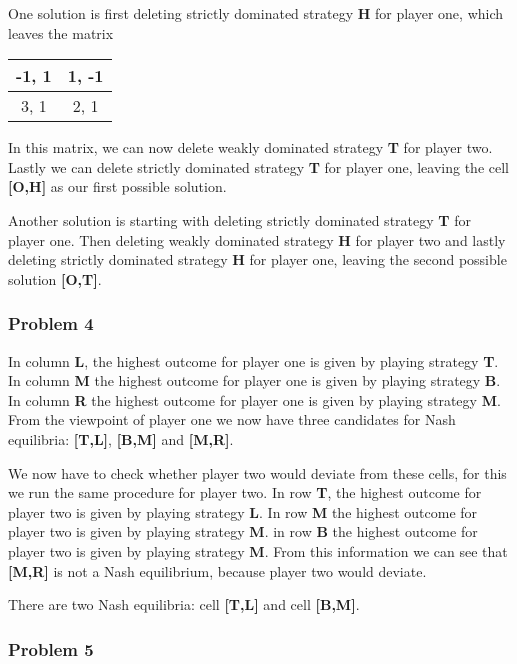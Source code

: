 \documentclass[]{article}
\begin{document}
One solution is first deleting strictly dominated strategy \textbf{H} for
player one, which leaves the matrix

\begin{tabular}{| c | c |}
  \hline			
  -1, 1 &  1, -1 \\
\hline
  3, 1 & 2, 1 \\
  \hline  
\end{tabular}

In this matrix, we can now delete weakly dominated strategy \textbf{T} for
player two. Lastly we can delete strictly dominated strategy \textbf{T}
for player one, leaving the cell \textbf{[O,H]} as our first possible
solution.

Another solution is starting with deleting strictly dominated strategy
\textbf{T} for player one. Then deleting weakly dominated strategy
\textbf{H} for player two and lastly deleting strictly dominated strategy
\textbf{H} for player one, leaving the second possible solution \textbf{[O,T]}.

\subsubsection{Problem 4}\label{problem-4}

In column \textbf{L}, the highest outcome for player one is given by
playing strategy \textbf{T}. In column \textbf{M} the highest outcome for
player one is given by playing strategy \textbf{B}. In column \textbf{R} the
highest outcome for player one is given by playing strategy \textbf{M}.
From the viewpoint of player one we now have three candidates for Nash
equilibria: \textbf{[T,L]}, \textbf{[B,M]} and \textbf{[M,R]}.\strut

We now have to check whether player two would deviate from these cells,
for this we run the same procedure for player two. In row \textbf{T}, the
highest outcome for player two is given by playing strategy \textbf{L}. In
row \textbf{M} the highest outcome for player two is given by playing
strategy \textbf{M}. in row \textbf{B} the highest outcome for player two is
given by playing strategy \textbf{M}. From this information we can see
that \textbf{[M,R]} is not a Nash equilibrium, because player two would
deviate.\strut
There are two Nash equilibria: cell \textbf{[T,L]} and cell \textbf{[B,M]}.\strut

\subsubsection{Problem 5}\label{problem-5}
\end{document}
